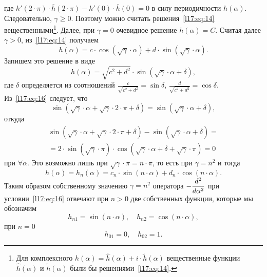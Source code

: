 где $h'(2\cdot\pi)\cdot\overline{h}(2\cdot\pi)-h'(0)\cdot \overline{h}(0)=0$ в силу периодичности $h(\alpha)$. Следовательно, $\gamma\geqslant0$. Поэтому можно считать решения~\eqref{l17:eq:14} вещественными\footnote{Для комплексного $h(\alpha)=\widehat{h}(\alpha)+i\cdot\widetilde{h}(\alpha)$ вещественные функции $\widehat{h}(\alpha)$ и $\widetilde{h}(\alpha)$ были бы решениями~\eqref{l17:eq:14}.}. Далее, при $\gamma=0$ очевидное решение $h(\alpha)=C$. Считая далее $\gamma>0$, из~\eqref{l17:eq:14} получаем 
\begin{equation*}
	 h(\alpha)=c\cdot\cos\left(\sqrt{\gamma}\cdot\alpha\right)+d\cdot\sin\left(\sqrt{\gamma}\cdot\alpha\right).
\end{equation*} 
Запишем это решение в виде
\begin{equation*}
	 h(\alpha)=\sqrt{c^2+d^2}\cdot\sin\left(\sqrt{\gamma}\cdot\alpha+\delta\right),
\end{equation*}
где $\delta$ определяется из соотношений $\displaystyle \frac{c}{\sqrt{c^2+d^2}}=\sin\delta$, $\displaystyle \frac{d}{\sqrt{c^2+d^2}}=\cos\delta$. Из~\eqref{l17:eq:16} следует, что 
\begin{equation*}
	\sin\left(\sqrt{\gamma}\cdot\alpha+\sqrt{\gamma}\cdot2\cdot\pi+\delta\right)=\sin\left(\sqrt{\gamma}\cdot\alpha+\delta\right),
\end{equation*}
откуда
\begin{multline*}
	\sin\left(\sqrt{\gamma}\cdot\alpha+\sqrt{\gamma}\cdot 2\cdot\pi+\delta\right)-\sin\left(\sqrt{\gamma}\cdot\alpha+\delta\right)=\\=2\cdot\sin\left(\sqrt{\gamma}\cdot\pi\right)\cdot\cos\left(\sqrt{\gamma}\cdot\alpha+\delta+\sqrt{\gamma}\cdot\pi\right)=0
\end{multline*}
при $\forall\alpha$. Это возможно лишь при $\sqrt{\gamma}\cdot \pi=n\cdot \pi$, то есть при $\gamma=n^2$ и тогда 
\begin{equation*}
	 h(\alpha)=h_{n}(\alpha)=c_n\cdot\sin\left(n\cdot \alpha\right)+d_n\cdot\cos\left(n\cdot \alpha\right). 
\end{equation*} 
Таким образом собственному значению $\gamma=n^2$ оператора $\displaystyle-\frac{d^2}{d\alpha^2}$ при условии~\eqref{l17:eq:16} отвечают при $n>0$ две собственных функции, которые %
мы обозначим 
\begin{equation*}
	 h_{n1}=\sin\left(n\cdot \alpha\right),\quad h_{n2}=\cos\left(n\cdot \alpha\right),
\end{equation*}
при $n=0$
\begin{equation*}
	 h_{01}=0,\quad h_{02}=1.
\end{equation*}
